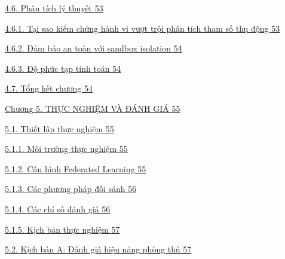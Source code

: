 \hyperref[phuxe2n-tuxedch-luxfd-thuyux1ebft]{4.6. Phân tích lý thuyết \hyperref[phuxe2n-tuxedch-luxfd-thuyux1ebft]{53}}

\hyperref[tux1ea1i-sao-kiux1ec3m-chux1ee9ng-huxe0nh-vi-vux1b0ux1ee3t-trux1ed9i-phuxe2n-tuxedch-tham-sux1ed1-thux1ee5-ux111ux1ed9ng]{4.6.1. Tại sao kiểm chứng hành vi vượt trội phân tích tham số thụ động \hyperref[tux1ea1i-sao-kiux1ec3m-chux1ee9ng-huxe0nh-vi-vux1b0ux1ee3t-trux1ed9i-phuxe2n-tuxedch-tham-sux1ed1-thux1ee5-ux111ux1ed9ng]{53}}

\hyperref[ux111ux1ea3m-bux1ea3o-an-touxe0n-vux1edbi-sandbox-isolation]{4.6.2. Đảm bảo an toàn với sandbox isolation \hyperref[ux111ux1ea3m-bux1ea3o-an-touxe0n-vux1edbi-sandbox-isolation]{54}}

\hyperref[ux111ux1ed9-phux1ee9c-tux1ea1p-tuxednh-touxe1n]{4.6.3. Độ phức tạp tính toán \hyperref[ux111ux1ed9-phux1ee9c-tux1ea1p-tuxednh-touxe1n]{54}}

\hyperref[tux1ed5ng-kux1ebft-chux1b0ux1a1ng-2]{4.7. Tổng kết chương \hyperref[tux1ed5ng-kux1ebft-chux1b0ux1a1ng-2]{54}}

\hyperref[chux1b0ux1a1ng-5.-thux1ef1c-nghiux1ec7m-vuxe0-ux111uxe1nh-giuxe1]{Chương 5. THỰC NGHIỆM VÀ ĐÁNH GIÁ \hyperref[chux1b0ux1a1ng-5.-thux1ef1c-nghiux1ec7m-vuxe0-ux111uxe1nh-giuxe1]{55}}

\hyperref[thiux1ebft-lux1eadp-thux1ef1c-nghiux1ec7m]{5.1. Thiết lập thực nghiệm \hyperref[thiux1ebft-lux1eadp-thux1ef1c-nghiux1ec7m]{55}}

\hyperref[muxf4i-trux1b0ux1eddng-thux1ef1c-nghiux1ec7m]{5.1.1. Môi trường thực nghiệm \hyperref[muxf4i-trux1b0ux1eddng-thux1ef1c-nghiux1ec7m]{55}}

\hyperref[cux1ea5u-huxecnh-federated-learning]{5.1.2. Cấu hình Federated Learning \hyperref[cux1ea5u-huxecnh-federated-learning]{55}}

\hyperref[cuxe1c-phux1b0ux1a1ng-phuxe1p-ux111ux1ed1i-suxe1nh]{5.1.3. Các phương pháp đối sánh \hyperref[cuxe1c-phux1b0ux1a1ng-phuxe1p-ux111ux1ed1i-suxe1nh]{56}}

\hyperref[cuxe1c-chux1ec9-sux1ed1-ux111uxe1nh-giuxe1-1]{5.1.4. Các chỉ số đánh giá \hyperref[cuxe1c-chux1ec9-sux1ed1-ux111uxe1nh-giuxe1-1]{56}}

\hyperref[kux1ecbch-bux1ea3n-thux1ef1c-nghiux1ec7m]{5.1.5. Kịch bản thực nghiệm \hyperref[kux1ecbch-bux1ea3n-thux1ef1c-nghiux1ec7m]{57}}

\hyperref[kux1ecbch-bux1ea3n-a-ux111uxe1nh-giuxe1-hiux1ec7u-nux103ng-phuxf2ng-thux1ee7]{5.2. Kịch bản A: Đánh giá hiệu năng phòng thủ \hyperref[kux1ecbch-bux1ea3n-a-ux111uxe1nh-giuxe1-hiux1ec7u-nux103ng-phuxf2ng-thux1ee7]{57}}

